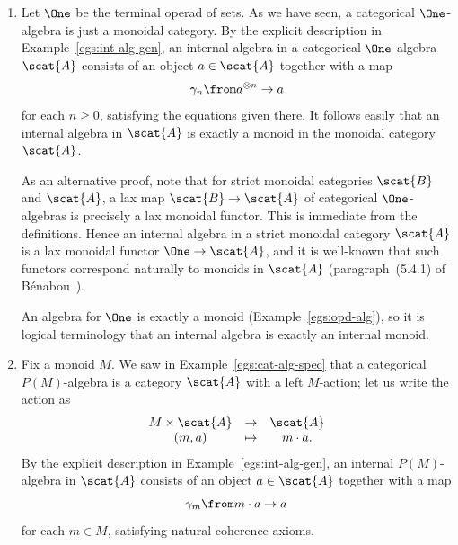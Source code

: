 \begin{examples}
\begin{enumerate}
\item
Let $\One$ be the terminal%
% 
%
% 
operad of sets.  As we have seen, a categorical
$\One$-algebra is just a monoidal category.  By the explicit
description in Example~\ref{egs:int-alg-gen}, an
internal algebra in a categorical $\One$-algebra $\scat{A}$ consists
of an object $a \in \scat{A}$ together with a map 
\[
\gamma_n \from a^{\otimes n} \to a
\]
for each $n \geq 0$, satisfying the equations given there.  It follows
easily that an internal algebra in $\scat{A}$ is exactly a monoid%
%
% 
in the monoidal category $\scat{A}$.

As an alternative proof, note that for strict monoidal
categories $\scat{B}$ and $\scat{A}$, a lax map $\scat{B} \to \scat{A}$ of
categorical $\One$-algebras is precisely a lax monoidal functor.  This is
immediate from the definitions.  Hence an internal algebra in a strict
monoidal category $\scat{A}$ is a lax monoidal functor $\One \to \scat{A}$,
and it is well-known that such functors correspond naturally to monoids in
$\scat{A}$ (paragraph~(5.4.1) of B\'enabou~\cite{BenIB}).

An algebra for $\One$ is exactly a monoid
(Example~\ref{egs:opd-alg}), so it is logical
terminology that an internal algebra is exactly an internal monoid.

\item
Fix a monoid%
%
%
% 
$M$.  We saw in Example~\ref{egs:cat-alg-spec}
that a categorical $P(M)$-algebra is a category $\scat{A}$ with a left
$M$-action; let us write the action as
\[
\begin{array}{ccc}
M \times \scat{A}       &\to            &\scat{A}       \\
(m, a)                  &\mapsto        &m \cdot a.
\end{array}
\]
By the explicit description in
Example~\ref{egs:int-alg-gen}, an internal
$P(M)$-algebra in $\scat{A}$ consists of an object $a \in \scat{A}$
together with a map
\[
\gamma_m \from m \cdot a \to a
\]
for each $m \in M$, satisfying natural coherence axioms.  
\end{enumerate}
\end{examples}

